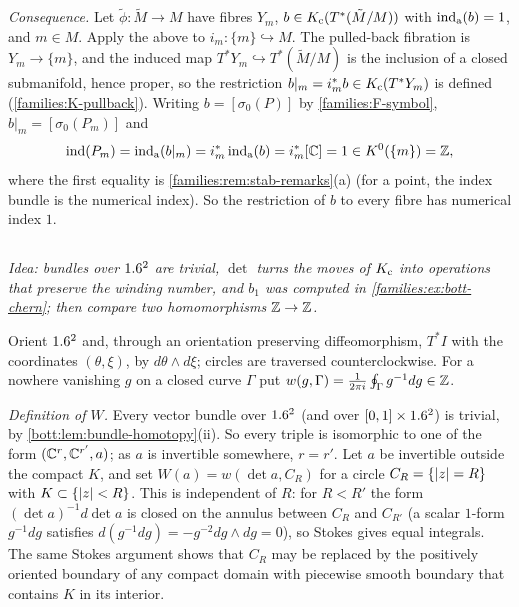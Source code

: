 \emph{Consequence.} Let $\tilde\phi:\tilde M\to M$ have fibres $Y_m$, $b\in K_{\mathrm{c}}(T^*(\tilde
M/M))$ with $\operatorname{ind}_{\mathrm{a}}(b)=1$, and $m\in M$. Apply the above to $i_m:\{m\}\hookrightarrow M$.
The pulled-back fibration is $Y_m\to\{m\}$, and the induced map
$T^*Y_m\hookrightarrow T^*(\tilde M/M)$ is the inclusion of a closed submanifold, hence
proper, so the restriction $b|_m=i_m^*b\in K_{\mathrm{c}}(T^*Y_m)$ is defined
(\ref{families:K-pullback}). Writing $b=[\sigma_0(P)]$ by \ref{families:F-symbol},
$b|_m=[\sigma_0(P_m)]$ and
\begin{equation*}
\operatorname{ind}(P_m)=\operatorname{ind}_{\mathrm{a}}(b|_m)=i_m^*\operatorname{ind}_{\mathrm{a}}(b)=i_m^*[\mathbb{C}]=1\in K^0(\{m\})=\mathbb{Z},
\end{equation*}
where the first equality is \cref{families:rem:stab-remarks}(a) (for a point, the
index bundle is the numerical index). So the restriction of $b$ to every fibre has
numerical index $1$.

\subsection*{}
\emph{Idea: bundles over $1.6^2$ are trivial, $\det$ turns the moves of $K_{\mathrm{c}}$ into
operations that preserve the winding number, and $b_1$ was computed in
\cref{families:ex:bott-chern}; then compare two homomorphisms $\mathbb{Z}\to\mathbb{Z}$.}

Orient $1.6^2$ and, through an orientation preserving diffeomorphism, $T^*I$ with the
coordinates $(\theta,\xi)$, by $d\theta\wedge d\xi$; circles are traversed
counterclockwise. For a nowhere vanishing $g$ on a closed curve $\Gamma$ put
$w(g,\Gamma)=\frac1{2\pi i}\oint_\Gamma g^{-1}dg\in\mathbb{Z}$.

\emph{Definition of $W$.} Every vector bundle over $1.6^2$ (and over $[0,1]\times1.6^2$)
is trivial, by \cref{bott:lem:bundle-homotopy}(ii). So every triple is isomorphic to one
of the form $(\mathbb{C}^r,\mathbb{C}^{r'},a)$; as $a$ is invertible somewhere, $r=r'$. Let $a$ be
invertible outside the compact $K$, and set $W(a)=w(\det a,C_R)$ for a circle $C_R=\{\lvert z\rvert=R\}$ with $K\subset\{\lvert z\rvert<R\}$. This is independent of $R$: for $R<R'$ the form
$(\det a)^{-1}d\det a$ is closed on the annulus between $C_R$ and $C_{R'}$ (a scalar
$1$-form $g^{-1}dg$ satisfies $d(g^{-1}dg)=-g^{-2}dg\wedge dg=0$), so Stokes gives equal
integrals. The same Stokes argument shows that $C_R$ may be replaced by the positively
oriented boundary of any compact domain with piecewise smooth boundary that contains $K$
in its interior.

